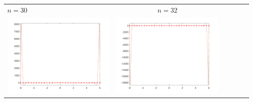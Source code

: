 \small\begin{tabular}{l*{5}{c}}
\hspace{3.5cm}\(n=30\) &  \(n=32\) \\
\includegraphics[scale=0.5]{cap4/4_9/30.png} &  \includegraphics[scale=0.5]{cap4/4_9/32.png} \\


\end{tabular}
